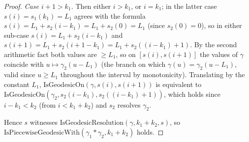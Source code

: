 \begin{proof}
  \emph{Case $i+1>k_1$.} Then either $i>k_1$, or $i=k_1$; in the latter case $s(i)=s_1(k_1)=L_1$
  agrees with the formula $s(i)=L_1+s_2(i-k_1)=L_1+s_2(0)=L_1$ (since $s_2(0)=0$), so in either
  sub-case $s(i)=L_1+s_2(i-k_1)$ and $s(i+1)=L_1+s_2(i+1-k_1)=L_1+s_2((i-k_1)+1)$. By the second
  arithmetic fact both values are $\ge L_1$, so on $[s(i),s(i+1)]$ the values of $\gamma$ coincide
  with $u \mapsto \gamma_2(u-L_1)$ (the branch on which $\gamma(u)=\gamma_2(u-L_1)$, valid since
  $u \ge L_1$ throughout the interval by monotonicity). Translating by the constant $L_1$,
  $\mathrm{IsGeodesicOn}(\gamma,s(i),s(i+1))$ is equivalent to
  $\mathrm{IsGeodesicOn}(\gamma_2,s_2(i-k_1),s_2((i-k_1)+1))$, which holds since $i-k_1<k_2$ (from
  $i<k_1+k_2$) and $s_2$ resolves $\gamma_2$.

  Hence $s$ witnesses $\mathrm{IsGeodesicResolution}(\gamma,k_1+k_2,s)$, so
  $\mathrm{IsPiecewiseGeodesicWith}(\gamma_1*\gamma_2,k_1+k_2)$ holds.
\end{proof}
